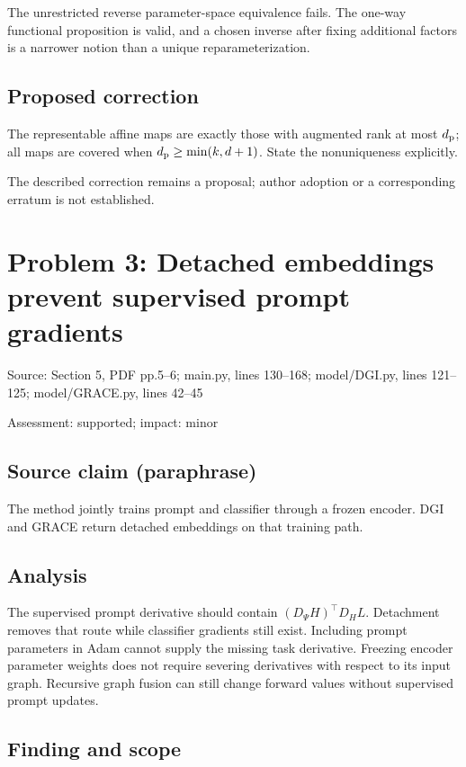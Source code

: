 \documentclass[11pt]{article}
\begin{document}
The unrestricted reverse parameter-space equivalence fails. The one-way functional proposition is valid, and a chosen inverse after fixing additional factors is a narrower notion than a unique reparameterization.

\subsection*{Proposed correction}

The representable affine maps are exactly those with augmented rank at most \(d_{\rm p}\); all maps are covered when \(d_{\rm p}\geq\min(k,d+1)\). State the nonuniqueness explicitly.

The described correction remains a proposal; author adoption or a corresponding erratum is not established.

\section*{Problem 3: Detached embeddings prevent supervised prompt gradients}

Source: Section 5, PDF pp.5–6; main.py, lines 130–168; model/DGI.py, lines 121–125; model/GRACE.py, lines 42–45

Assessment: supported; impact: minor

\subsection*{Source claim (paraphrase)}

The method jointly trains prompt and classifier through a frozen encoder. DGI and GRACE return detached embeddings on that training path.

\subsection*{Analysis}

The supervised prompt derivative should contain \((D_\Psi H)^\top D_H L\). Detachment removes that route while classifier gradients still exist. Including prompt parameters in Adam cannot supply the missing task derivative. Freezing encoder parameter weights does not require severing derivatives with respect to its input graph. Recursive graph fusion can still change forward values without supervised prompt updates.

\subsection*{Finding and scope}
\end{document}
